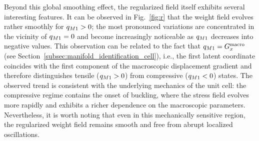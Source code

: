 \documentclass[11pt,a4paper]{article}
\begin{document}



 Beyond this global smoothing effect, the regularized field itself exhibits several interesting features. It can be observed  in Fig.~\ref{fig:r} that the weight field evolves rather smoothly for $q_{M1}>0$;    the most pronounced variations are concentrated in the vicinity of $q_{M1}=0$ and become increasingly noticeable as $q_{M1}$ decreases into negative values. This observation can be related to the fact that $q_{M1}={G}^{\mathrm{macro}}_x$ (see Section~\ref{subsec:manifold_identification_cell}), i.e., the first latent coordinate coincides with the first component of the macroscopic displacement gradient and therefore distinguishes tensile ($q_{M1}>0$) from compressive ($q_{M1}<0$) states. The observed trend is consistent with the underlying mechanics of the unit cell: the compressive regime contains the onset of buckling, where the stress field evolves more rapidly and exhibits a richer dependence on the macroscopic parameters. Nevertheless, it is worth noting that  even in this mechanically sensitive region, the regularized weight field remains smooth and free from abrupt localized oscillations.

\end{document}
